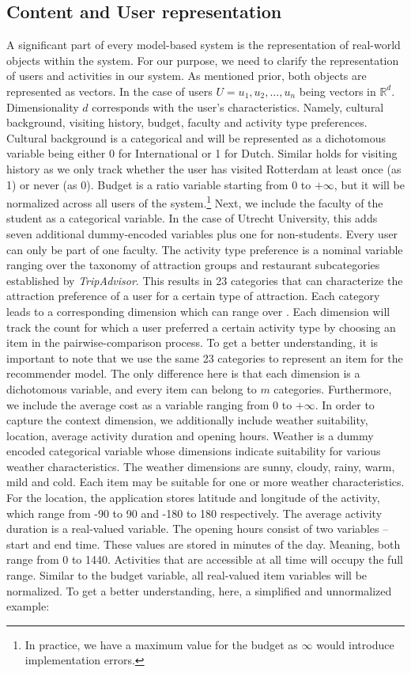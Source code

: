\documentclass[11pt,a4paper,oneside]{article}
\begin{document}
\subsection{Content and User representation}
A significant part of every model-based system is the representation of real-world objects within the system. For our purpose, we need to clarify the representation of users and activities in our system. As mentioned prior, both objects are represented as vectors. In the case of users $U = {u_1, u_2, \ldots, u_n} $ being vectors in $\mathbb{R}^d$. Dimensionality $d$ corresponds with the user's characteristics. Namely, cultural background, visiting history, budget, faculty and activity type preferences. Cultural background is a categorical and will be represented as a dichotomous variable being either 0 for International or 1 for Dutch. Similar holds for visiting history as we only track whether the user has visited Rotterdam at least once (as 1) or never (as 0). Budget is a ratio variable starting from 0 to $+\infty$, but it will be normalized across all users of the system.\footnote{In practice, we have a maximum value for the budget as $\infty$ would introduce implementation errors.} Next, we include the faculty of the student as a categorical variable. In the case of Utrecht University, this adds seven additional dummy-encoded variables plus one for non-students. Every user can only be part of one faculty. The activity type preference is a nominal variable ranging over the taxonomy of attraction groups and restaurant subcategories established by \emph{TripAdvisor}.\cite{tripadvisorllc_ContentAPIBusiness_2020} This results in 23 categories that can characterize the attraction preference of a user for a certain type of attraction. Each category leads to a corresponding dimension which can range over . Each dimension will track the count for which a user preferred a certain activity type by choosing an item in the pairwise-comparison process. 
To get a better understanding, it is important to note that we use the same 23 categories to represent an item for the recommender model. The only difference here is that each dimension is a dichotomous variable, and every item can belong to $m$ categories. Furthermore, we include the average cost as a variable ranging from 0 to $+\infty$. In order to capture the context dimension, we additionally include weather suitability, location, average activity duration and opening hours. Weather is a dummy encoded categorical variable whose dimensions indicate suitability for various weather characteristics. The weather dimensions are sunny, cloudy, rainy, warm, mild and cold. Each item may be suitable for one or more weather characteristics. For the location, the application stores latitude and longitude of the activity, which range from -90 to 90 and -180 to 180 respectively. The average activity duration is a real-valued variable. The opening hours consist of two variables -- start and end time. These values are stored in minutes of the day. Meaning, both range from 0 to 1440. Activities that are accessible at all time will occupy the full range. Similar to the budget variable, all real-valued item variables will be normalized. To get a better understanding, here, a simplified and unnormalized example:
\end{document}
